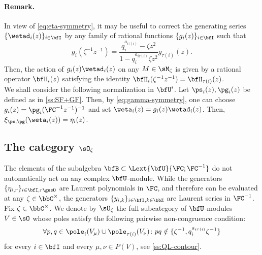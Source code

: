 \documentclass[reqno]{amsart}
\numberwithin{equation}{section}
\newenvironment{remark}{\medskip\paragraph{{\bf Remark.}}}{\par\medskip}
\begin{document}
\begin{remark}\label{rmk:eta-normalization}
In view of \eqref{eq:eta-symmetry}, it may be useful to correct the generating series $\{\wetad_i(z)\}_{i\in\bfI}$ by any family of rational functions $\{g_i(z)\}_{i\in\bfI}$ such that 
\[g_i(\zeta^{-1}z^{-1})=
\frac{q_i^{a_{i\tau(i)}}-\zeta z^2}{1-q_i^{a_{i\tau(i)}}\zeta z^2}
g_{\tau(i)}(z).\]
Then, the action of $g_i(z)\wetad_i(z)$ on any $M\in\sM_{\zeta}$ is given by
a rational operator $\bfH_i(z)$ satisfying the identity $\bfH_i(\zeta^{-1}z^{-1})=\bfH_{\tau(i)}(z)$.\\

We shall consider the following normalization in $\bfU^\imath$.
Let $\ps_i(z),\pg_i(z)$ be defined as in \ref{ss:SF+GF}. Then, by \eqref{eq:gamma-symmetry}, one can choose $g_i(z)=\pg_i(\FC^{-1}z^{-1})^{-1}$ and set $\weta_i(z)=g_i(z)\wetad_i(z)$. Then, $\xi_{\ps,\pg}(\weta_i(z))=\eta_i(z)$.	
\hfill\rmkend
\end{remark}

\subsection{The category \texorpdfstring{$\sO_\zeta$}{O-zeta}}\label{ss:cat-O-zeta}
The elements of the subalgebra $\bfB\subset\Lext{\bfU}{\FC;\FC^{-1}}$
do not automatically act on any complex $\bfU$-module.
While the generators
$\{\eta_{i,r}\}_{i\in\bfI,r\ges0}$ are Laurent polynomials in $\FC$, and
therefore can be evaluated at any $\zeta\in\bbC^\times$, the generators
$\{y_{i,k}\}_{i\in\bfI,k\in\bbZ}$ are Laurent series in $\FC^{-1}$.\\

Fix $\zeta\in\bbC^\times$. We denote by $\sO_\zeta$ the full subcategory of
$\bfU$-modules $V\in\sO$ whose poles satisfy the following pairwise
non-congruence condition:
\begin{equation}\label{eq:cat-W-zeta}
\forall p,q\in\pole_i(V_\mu)\cup\pole_{\tau(i)}(V_\nu)\colon
pq\notin
\{\zeta^{-1},q_i^{a_{i\tau(i)}}\zeta^{-1}\}
\end{equation}
for every $i\in\bfI$ and every $\mu,\nu\in P(V)$, see \ref{ss:QL-contour}.\\
\end{document}
